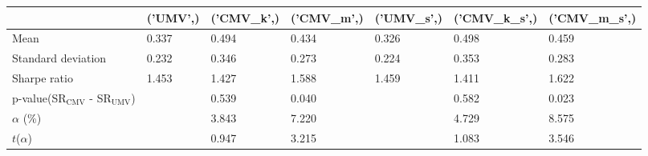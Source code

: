 \begin{tabular}{lllllll}
\toprule
 & ('UMV',) & ('CMV_k',) & ('CMV_m',) & ('UMV_s',) & ('CMV_k_s',) & ('CMV_m_s',) \\
\midrule
Mean & 0.337 & 0.494 & 0.434 & 0.326 & 0.498 & 0.459 \\
Standard deviation & 0.232 & 0.346 & 0.273 & 0.224 & 0.353 & 0.283 \\
Sharpe ratio & 1.453 & 1.427 & 1.588 & 1.459 & 1.411 & 1.622 \\
p-value(SR$_{\text{CMV}}$ - SR$_{\text{UMV}}$) &  & 0.539 & 0.040 &  & 0.582 & 0.023 \\
$\alpha$ (\%) &  & 3.843 & 7.220 &  & 4.729 & 8.575 \\
$t$($\alpha$) &  & 0.947 & 3.215 &  & 1.083 & 3.546 \\
\bottomrule
\end{tabular}
